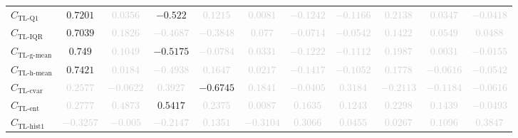 \documentclass{standalone}
\newcommand{\tlqonename}{\text{TL-Q1}}
\newcommand{\tlqone}{C_{\tlqonename}}
\newcommand{\tliqrname}{\text{TL-IQR}}
\newcommand{\tliqr}{C_{\tliqrname}}
\newcommand{\tlgmeanname}{\text{TL-g-mean}}
\newcommand{\tlgmean}{C_{\tlgmeanname}}
\newcommand{\tlhmeanname}{\text{TL-h-mean}}
\newcommand{\tlhmean}{C_{\tlhmeanname}}
\newcommand{\tlcvariationname}{\text{TL-cvar}}
\newcommand{\tlcvariation}{C_{\tlcvariationname}}
\newcommand{\tlentropyname}{\text{TL-ent}}
\newcommand{\tlentropy}{C_{\tlentropyname}}
\newcommand{\tlhistonename}{\text{TL-hist1}}
\newcommand{\tlhistone}{C_{\tlhistonename}}
\begin{document}
\begin{tabular}{lcccccccccc}
$\tlqone$ & $0.7201$ & \textcolor{lightgray}{$0.0356$} & $-0.522$ & \textcolor{lightgray}{$0.1215$} & \textcolor{lightgray}{$0.0081$} & \textcolor{lightgray}{$-0.1242$} & \textcolor{lightgray}{$-0.1166$} & \textcolor{lightgray}{$0.2138$} & \textcolor{lightgray}{$0.0347$} & \textcolor{lightgray}{$-0.0418$} \\ 
$\tliqr$ & $0.7039$ & \textcolor{lightgray}{$0.1826$} & \textcolor{lightgray}{$-0.4687$} & \textcolor{lightgray}{$-0.3848$} & \textcolor{lightgray}{$0.077$} & \textcolor{lightgray}{$-0.0714$} & \textcolor{lightgray}{$-0.0542$} & \textcolor{lightgray}{$0.1422$} & \textcolor{lightgray}{$0.0549$} & \textcolor{lightgray}{$0.0488$} \\ 
$\tlgmean$ & $0.749$ & \textcolor{lightgray}{$0.1049$} & $-0.5175$ & \textcolor{lightgray}{$-0.0784$} & \textcolor{lightgray}{$0.0331$} & \textcolor{lightgray}{$-0.1222$} & \textcolor{lightgray}{$-0.1112$} & \textcolor{lightgray}{$0.1987$} & \textcolor{lightgray}{$0.0031$} & \textcolor{lightgray}{$-0.0155$} \\ 
$\tlhmean$ & $0.7421$ & \textcolor{lightgray}{$0.0184$} & \textcolor{lightgray}{$-0.4938$} & \textcolor{lightgray}{$0.1647$} & \textcolor{lightgray}{$0.0217$} & \textcolor{lightgray}{$-0.1417$} & \textcolor{lightgray}{$-0.1052$} & \textcolor{lightgray}{$0.1778$} & \textcolor{lightgray}{$-0.0616$} & \textcolor{lightgray}{$-0.0542$} \\ 
$\tlcvariation$ & \textcolor{lightgray}{$0.2577$} & \textcolor{lightgray}{$-0.0622$} & \textcolor{lightgray}{$0.3927$} & $-0.6745$ & \textcolor{lightgray}{$0.1841$} & \textcolor{lightgray}{$-0.0405$} & \textcolor{lightgray}{$0.3184$} & \textcolor{lightgray}{$-0.2113$} & \textcolor{lightgray}{$-0.1184$} & \textcolor{lightgray}{$-0.0616$} \\ 
$\tlentropy$ & \textcolor{lightgray}{$0.2777$} & \textcolor{lightgray}{$0.4873$} & $0.5417$ & \textcolor{lightgray}{$0.2375$} & \textcolor{lightgray}{$0.0087$} & \textcolor{lightgray}{$0.1635$} & \textcolor{lightgray}{$0.1243$} & \textcolor{lightgray}{$0.2298$} & \textcolor{lightgray}{$0.1439$} & \textcolor{lightgray}{$-0.0493$} \\ 
$\tlhistone$ & \textcolor{lightgray}{$-0.3257$} & \textcolor{lightgray}{$-0.005$} & \textcolor{lightgray}{$-0.2147$} & \textcolor{lightgray}{$0.1351$} & \textcolor{lightgray}{$-0.3104$} & \textcolor{lightgray}{$0.3066$} & \textcolor{lightgray}{$0.0455$} & \textcolor{lightgray}{$0.0267$} & \textcolor{lightgray}{$0.1096$} & \textcolor{lightgray}{$0.3847$} \\ 

\end{tabular}
\end{document}
